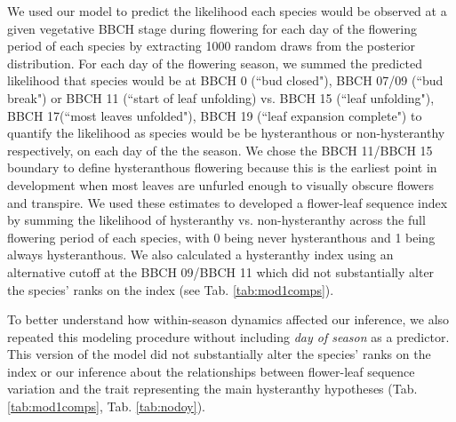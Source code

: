 \documentclass{article}[12pt]
\begin{document}
We used our model to predict the likelihood each species would be observed at a given vegetative BBCH stage during flowering for each day of the flowering period of each species by extracting 1000 random draws from the posterior distribution. For each day of the flowering season, we summed the predicted likelihood that species would be at BBCH 0  (``bud closed"), BBCH 07/09 (``bud break") or BBCH 11 (``start of leaf unfolding) vs. BBCH 15 (``leaf unfolding"), BBCH 17(``most leaves unfolded"), BBCH 19 (``leaf expansion complete") to quantify the likelihood as species would be be hysteranthous or non-hysteranthy respectively, on each day of the the season. We chose the BBCH 11/BBCH 15 boundary to define hysteranthous flowering because this is the earliest point in development when most leaves are unfurled enough to visually obscure flowers and transpire. We used these estimates to  developed a flower-leaf sequence index by summing the likelihood of hysteranthy vs. non-hysteranthy across the full flowering period of each species, with 0 being never hysteranthous and 1 being always hysteranthous. We also calculated a hysteranthy index using an alternative cutoff at the BBCH 09/BBCH 11 which did not substantially alter the species' ranks on the index (see Tab. \ref{tab:mod1comps}). 

To better understand how within-season dynamics affected our inference, we also repeated this modeling procedure without including \emph{day of season} as a predictor. This version of the model did not substantially alter the species' ranks on the index or our inference about the relationships between flower-leaf sequence variation and the trait representing the main hysteranthy hypotheses (Tab. \ref{tab:mod1comps}, Tab. \ref{tab:nodoy}).
\end{document}
